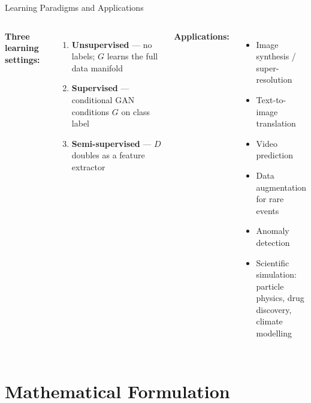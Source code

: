 \documentclass[aspectratio=169,11pt]{beamer}
\begin{document}
\begin{frame}{Learning Paradigms and Applications}
  \begin{columns}[T]
      \textbf{Three learning settings:}
      \begin{enumerate}
        \item \textbf{Unsupervised} — no labels; $G$ learns the full data manifold
        \item \textbf{Supervised} — conditional GAN conditions $G$ on class label
        \item \textbf{Semi-supervised} — $D$ doubles as a feature extractor
      \end{enumerate}

      \textbf{Applications:}
      \begin{itemize}
        \item Image synthesis / super-resolution
        \item Text-to-image translation
        \item Video prediction
        \item Data augmentation for rare events
        \item Anomaly detection
        \item Scientific simulation:\\
              particle physics, drug discovery,\\
              climate modelling
      \end{itemize}
  \end{columns}
\end{frame}

\section{Mathematical Formulation}
\end{document}
